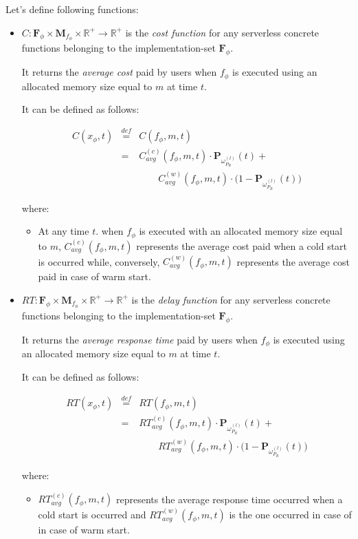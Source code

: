 \documentclass[12pt,a4paper]{report}
\newcommand{\mathDef}{\overset{\textit{def}}{=}}
\begin{document}
Let's define following functions:

\begin{itemize}	
	\item $C : \textbf{F}_{\phi} \times \textbf{M}_{f_{\phi}} \times \mathbb{R}^+ \to \mathbb{R}^+$ is the \textit{cost function} for any serverless concrete functions belonging to the implementation-set $\textbf{F}_{\phi}$. 
	
	It returns the \textit{average cost} paid by users when $f_{\phi}$ is executed using an allocated memory size equal to $m$ at time $t$. 
		
	It can be defined as follows:
	
	\begin{eqnarray}
		C(x_{\phi},t) & \mathDef & C(f_{\phi},m,t) \nonumber \\
		& = & C_{avg}^{(c)}(f_{\phi}, m,t) \cdot \textbf{P}_{\omega_{P_R}^{(l)}}(t) + \\
		& & \qquad C_{avg}^{(w)}(f_{\phi}, m,t) \cdot \Big( 1 - \textbf{P}_{\omega_{P_R}^{(l)}}(t)  \Big) \nonumber
	\end{eqnarray}
	
	where:
	
	\begin{itemize}
		\item At any time $t$. when $f_{\phi}$ is executed with an allocated memory size equal to $m$, 
		$C_{avg}^{(c)}(f_{\phi}, m,t)$ represents the average cost paid when a cold start is occurred while, conversely, $C_{avg}^{(w)}(f_{\phi}, m,t)$ represents the average cost paid in case of warm start.
	\end{itemize}
	
	
	\item $RT : \textbf{F}_{\phi} \times \textbf{M}_{f_{\phi}} \times \mathbb{R}^+ \to \mathbb{R}^+$ is the \textit{delay function} for any serverless concrete functions belonging to the implementation-set $\textbf{F}_{\phi}$. 
	
	It returns the \textit{average response time} paid by users when $f_{\phi}$ is executed using an allocated memory size equal to $m$ at time $t$. 
	
	It can be defined as follows:
	
	\begin{eqnarray}
		RT(x_{\phi},t) & \mathDef & RT(f_{\phi},m,t) \nonumber \\
		& = & RT_{avg}^{(c)}(f_{\phi}, m,t) \cdot \textbf{P}_{\omega_{P_R}^{(l)}}(t) + \\ 
		& & \qquad RT_{avg}^{(w)}(f_{\phi}, m,t) \cdot \Big( 1 - \textbf{P}_{\omega_{P_R}^{(l)}}(t)  \Big) \nonumber
	\end{eqnarray}

	where:
	
	\begin{itemize}
		\item $RT_{avg}^{(c)}(f_{\phi}, m,t)$ represents the average response time occurred when a cold start is occurred and $RT_{avg}^{(w)}(f_{\phi}, m,t)$ is the one occurred in case of in case of warm start.
	\end{itemize}
\end{itemize}
\end{document}

